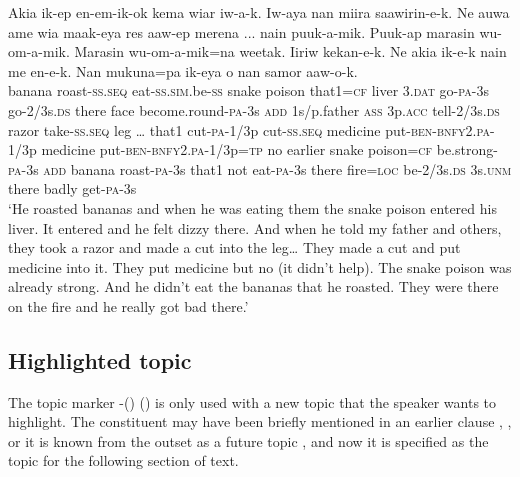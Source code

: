 \ea%
\label{ex:9:x1677}
\gll Akia  ik-ep  en-em-ik-ok      kema  wiar  iw-a-k. Iw-aya  nan  miira  saawirin-e-k. Ne  auwa  ame  wia  maak-eya  res  aaw-ep merena  ...  nain  puuk-a-mik.  Puuk-ap  marasin wu-om-a-mik.  Marasin  wu-om-a-mik=na weetak.  Iiriw     kekan-e-k. Ne  akia  ik-e-k  nain  me  en-e-k.  Nan mukuna=pa  ik-eya o  nan  samor  aaw-o-k.\\
banana  roast-\textsc{ss}.\textsc{seq}  eat-\textsc{ss}.\textsc{sim}.be-\textsc{ss}  snake  poison that1=\textsc{cf}  liver  3.\textsc{dat}  go-\textsc{pa}-3s go-2/3s.\textsc{ds}  there  face  become.round-\textsc{pa}-3s \textsc{add}  1s/p.father  \textsc{ass}  3p.\textsc{acc}  tell-2/3s.\textsc{ds}  razor  take-\textsc{ss}.\textsc{seq} leg  {\dots}  that1  cut-\textsc{pa}-1/3p  cut-\textsc{ss}.\textsc{seq}  medicine put-\textsc{ben}-\textsc{bnfy}2.\textsc{pa}-1/3p  medicine  put-\textsc{ben}-\textsc{bnfy}2.\textsc{pa}-1/3p=\textsc{tp} no  earlier  snake  poison=\textsc{cf}  be.strong-\textsc{pa}-3s \textsc{add}  banana  roast-\textsc{pa}-3s  that1  not  eat-\textsc{pa}-3s  there fire=\textsc{loc}  be-2/3s.\textsc{ds}  3s.\textsc{unm}  there  badly  get-\textsc{pa}-3s\\
\glt`He roasted bananas and when he was eating them the snake poison entered his liver. It entered and he felt dizzy there. And when he told my father and others, they took a razor and made a cut into the leg{\dots} They made a cut and put medicine into it. They put medicine but no (it didn't help). The snake poison was already strong. And he didn't eat the bananas that he roasted. They were there on the fire and he really got bad there.'
\z


\subsection{Highlighted topic}

The topic marker -() () is only used with a new topic that the speaker wants to highlight. The constituent may have been briefly mentioned in an earlier clause , , or it is known from the outset as a future topic , and now it is specified as the topic for the following section of text. 

